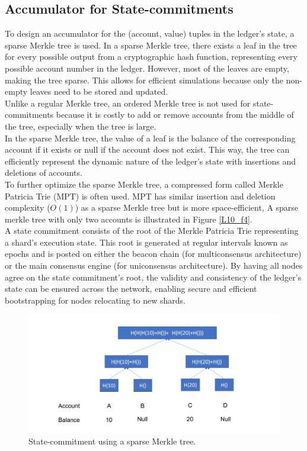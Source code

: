 \subsection{Accumulator for State-commitments}
To design an accumulator for the (account, value) tuples in the ledger's state, a sparse Merkle tree is used. In a sparse Merkle tree, there exists a leaf in the tree for every possible output from a cryptographic hash function, representing every possible account number in the ledger. However, most of the leaves are empty, making the tree sparse. This allows for efficient simulations because only the non-empty leaves need to be stored and updated.\\
Unlike a regular Merkle tree, an ordered Merkle tree is not used for state-commitments because it is costly to add or remove accounts from the middle of the tree, especially when the tree is large.\\
In the sparse Merkle tree, the value of a leaf is the balance of the corresponding account if it exists or null if the account does not exist. This way, the tree can efficiently represent the dynamic nature of the ledger's state with insertions and deletions of accounts.\\
To further optimize the sparse Merkle tree, a compressed form called Merkle Patricia Trie (MPT) is often used. MPT has similar insertion and deletion complexity ($O(1)$) as a sparse Merkle tree but is more space-efficient, A sparse merkle tree with only two accounts is illustrated in Figure \ref{L10_f4}.\\
A state commitment consists of the root of the Merkle Patricia Trie representing a shard's execution state. This root is generated at regular intervals known as epochs and is posted on either the beacon chain (for multiconsensus architecture) or the main consensus engine (for uniconsensus architecture). By having all nodes agree on the state commitment's root, the validity and consistency of the ledger's state can be ensured across the network, enabling secure and efficient bootstrapping for nodes relocating to new shards.
\begin{center}
	\begin{figure}
		\centering
		\includegraphics[width=0.8\linewidth]{Fig/10/F4}
		\caption{State-commitment using a sparse Merkle tree.}
		\label{fig:L10_f4}
	\end{figure}
\end{center}
